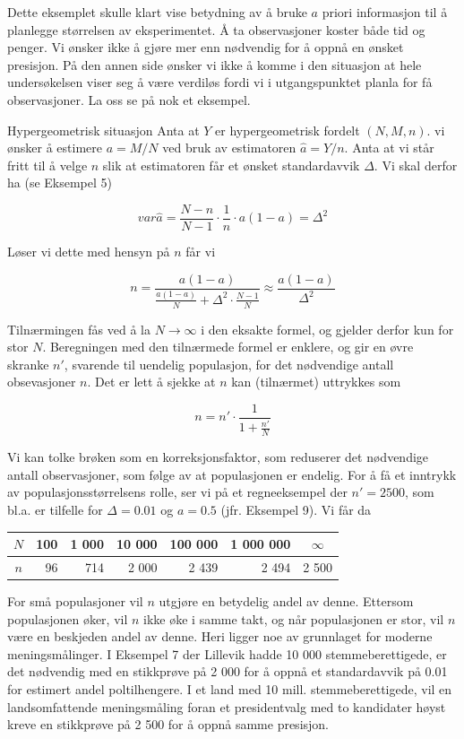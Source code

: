 Dette eksemplet skulle klart vise betydning av å bruke $a$ priori
informasjon til å planlegge størrelsen av eksperimentet. Å ta
observasjoner koster både tid og penger. Vi ønsker ikke å gjøre
mer enn nødvendig for å oppnå en ønsket presisjon. På den
 annen side ønsker vi ikke å komme i den situasjon at hele
undersøkelsen viser seg å være verdiløs fordi vi i
utgangspunktet planla for få observasjoner. La oss se på nok et eksempel.\\

\begin{eksempel}{Hypergeometrisk situasjon}
Anta at $Y$ er hypergeometrisk fordelt $(N, M, n)$. vi ønsker å
estimere $a=M/N$ ved bruk av estimatoren $\hat{a} =Y/n$. Anta at vi
står fritt til å velge $n$ slik at estimatoren får et ønsket
standardavvik $\Delta$. Vi skal derfor ha (se Eksempel 5)

\[ var\hat{a}=\frac{N-n}{N-1} \cdot \frac{1}{n} \cdot a(1-a) =  {\Delta }^2 \]

\noindent Løser vi dette med hensyn på $n$ får vi

\[ n=\frac{a(1-a)}{\frac{a(1-a)}{N}+{\Delta}^2 \cdot \frac{N-1}{N}}
                                 \approx \frac{a(1-a)}{{\Delta }^2} \]

\noindent Tilnærmingen fås ved å la $N\rightarrow \infty $ i den
 eksakte formel, og gjelder derfor kun for stor $N$. Beregningen med den
tilnærmede formel er enklere, og gir en øvre skranke $n'$,
svarende til uendelig populasjon, for det nødvendige antall
obsevasjoner $n$. Det er lett å sjekke at $n$ kan (tilnærmet)
uttrykkes som

\[  n=n'\cdot \frac{1}{1+\frac{n'}{N}} \] 

\noindent Vi kan tolke brøken som en korreksjonsfaktor, som reduserer
det nødvendige antall observasjoner, som følge av at
populasjonen er endelig. For å få et inntrykk av
populasjonsstørrelsens rolle, ser vi på et regneeksempel der
 $n'=2500$, som bl.a. er tilfelle for $\Delta =0.01$ og $a=0.5$
(jfr. Eksempel 9). Vi får da

\begin{center}
\begin{tabular}{c|rrrrrc}
 $N$ & 100 & 1 000 & 10 000 & 100 000 & 1 000 000 & $\infty$ \\ \hline
 $n$ & 96 & 714 & 2 000 & 2 439 & 2 494 & 2 500
\end{tabular}
\end{center}

\noindent For små populasjoner vil $n$ utgjøre en betydelig andel av denne.
Ettersom populasjonen øker, vil $n$ ikke øke i samme takt, og når
populasjonen er stor, vil $n$ være en beskjeden andel av denne.
Heri ligger noe av grunnlaget for moderne meningsmålinger. I
Eksempel 7 der Lillevik hadde 10 000 stemmeberettigede, er det nødvendig
 med en stikkprøve på 2 000 for å oppnå et standardavvik
på 0.01 for estimert andel poltilhengere. I et land med 10
mill. stemmeberettigede, vil en landsomfattende meningsmåling
foran et presidentvalg med to kandidater høyst kreve en
stikkprøve på 2 500 for å oppnå samme presisjon.
\end{eksempel}


